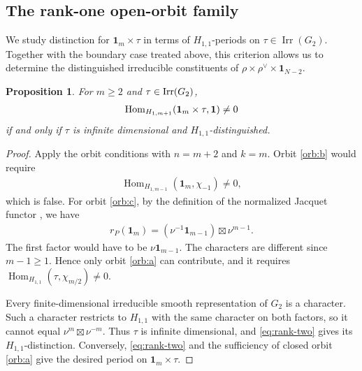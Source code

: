 \documentclass[11pt,leqno]{amsart}
\numberwithin{equation}{section}
\theoremstyle{plain}
\newtheorem{proposition}[theorem]{Proposition}
\theoremstyle{definition}
\theoremstyle{remark}
\DeclareMathOperator{\Hom}{Hom}
\DeclareMathOperator{\Irr}{Irr}
\newcommand{\one}{\mathbf{1}}
\begin{document}
	\subsection{The rank-one open-orbit family}
	We study distinction for $\one_m\times\tau$ in terms of
	$H_{1,1}$-periods on $\tau\in\Irr(G_2)$. Together with
	the boundary case treated above, this criterion allows us
	to determine the distinguished irreducible constituents of
	$\rho\times\rho^\vee\times\one_{N-2}$.
	
	\begin{proposition}\label{lem:character}
		For $m\ge2$ and $\tau\in{\rm Irr}(G_2)$,
		\begin{align*}
			{\rm Hom}_{H_{1,m+1}}(\one_m\times\tau,\one)\ne0
		\end{align*}
		if and only if $\tau$ is infinite dimensional and
		$H_{1,1}$-distinguished. 
	\end{proposition}
	\begin{proof}
		Apply the orbit conditions with \(n=m+2\) and \(k=m\).
		Orbit \ref{orb:b} would require
		\begin{align*}
			\Hom_{H_{1,m-1}}(\one_m,\chi_{-1})\ne0,
		\end{align*}
		which is false.
		For orbit \ref{orb:c}, by the definition of the normalized Jacquet functor \cite[Definition 1.22]{Solleveld}, we have
		\begin{align*}
			r_P(\one_m)
			=(\nu^{-1}\one_{m-1})\boxtimes\nu^{m-1}.
		\end{align*}
		The first factor would have to be $\nu\one_{m-1}$. The characters
		are different since $m-1\ge1$.
		Hence only orbit \ref{orb:a} can contribute, and it requires
		$\Hom_{H_{1,1}}(\tau, \chi_{m/2})\ne0$.
		
		Every finite-dimensional irreducible smooth representation of $G_2$ is a character. Such a character restricts to $H_{1,1}$ with the same character on both factors, so it cannot equal
		$\nu^m\boxtimes\nu^{-m}$. Thus $\tau$ is infinite dimensional,
		and \eqref{eq:rank-two} gives its $H_{1,1}$-distinction.
		Conversely, \eqref{eq:rank-two} and the sufficiency of closed
		orbit \ref{orb:a} give the desired period on $\one_m\times\tau$.
	\end{proof}
	
\end{document}
